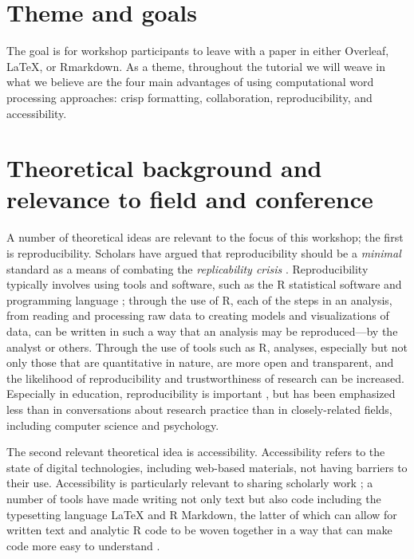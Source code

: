 \documentclass{article}
\begin{document}
\section{Theme and goals}

The goal is for workshop participants to leave with a paper in either Overleaf, LaTeX, or Rmarkdown. As a theme, throughout the tutorial we will weave in what we believe are the four main advantages of using computational word processing approaches: crisp formatting, collaboration, reproducibility, and accessibility.

\section{Theoretical background and relevance to field and conference}

A number of theoretical ideas are relevant to the focus of this workshop;
the first is reproducibility. Scholars have argued that reproducibility should
be a \textit{minimal} standard as a means of combating the \textit{replicability crisis} \parencite{peng11, hedges18}. 
Reproducibility typically involves using tools and software, such as the R 
statistical software and programming language \parencite{rcoreteam2020}; through the use of 
R, each of the steps in an analysis, from reading and processing raw data to creating
models and visualizations of data, can be written in such a way that an analysis
may be reproduced---by the analyst or others. Through the use of tools such as R, 
analyses, especially but not only those that are quantitative in nature, are more
open and transparent, and the likelihood of reproducibility and trustworthiness
of research can be increased. Especially in education, reproducibility is 
important \parencite{vanderzee2018}, but has been emphasized less than in conversations about 
research practice than in closely-related fields, including computer science and psychology.

The second relevant theoretical idea is accessibility. Accessibility refers to 
the state of digital technologies, including web-based materials, not having barriers
to their use. Accessibility is particularly relevant to sharing scholarly work \parencite{seo2019arow};
a number of tools have made writing not only text but also code including the typesetting 
language LaTeX and R Markdown,  the latter of which can allow for written text and analytic 
R code to be woven together in a way that can make code more easy to understand \parencite{knuth1984}.
\end{document}
